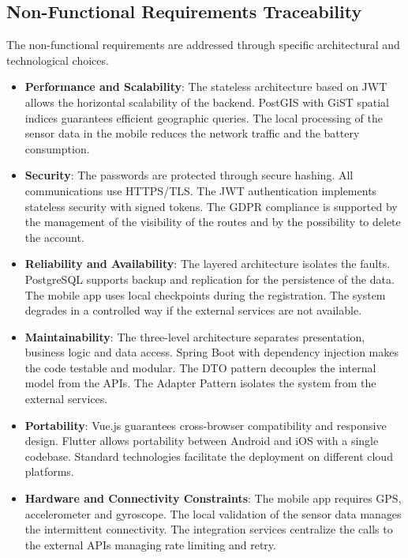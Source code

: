 \subsection{Non-Functional Requirements Traceability}
The non-functional requirements are addressed through specific architectural and technological choices.
\begin{itemize}
    \item \textbf{Performance and Scalability}: The stateless architecture based on JWT allows the horizontal scalability of the backend. PostGIS with GiST spatial indices guarantees efficient geographic queries. The local processing of the sensor data in the mobile reduces the network traffic and the battery consumption.
    \item \textbf{Security}: The passwords are protected through secure hashing. All communications use HTTPS/TLS. The JWT authentication implements stateless security with signed tokens. The GDPR compliance is supported by the management of the visibility of the routes and by the possibility to delete the account.
    \item \textbf{Reliability and Availability}: The layered architecture isolates the faults. PostgreSQL supports backup and replication for the persistence of the data. The mobile app uses local checkpoints during the registration. The system degrades in a controlled way if the external services are not available.
    \item \textbf{Maintainability}: The three-level architecture separates presentation, business logic and data access. Spring Boot with dependency injection makes the code testable and modular. The DTO pattern decouples the internal model from the APIs. The Adapter Pattern isolates the system from the external services.
    \item \textbf{Portability}: Vue.js guarantees cross-browser compatibility and responsive design. Flutter allows portability between Android and iOS with a single codebase. Standard technologies facilitate the deployment on different cloud platforms.
    \item \textbf{Hardware and Connectivity Constraints}: The mobile app requires GPS, accelerometer and gyroscope. The local validation of the sensor data manages the intermittent connectivity. The integration services centralize the calls to the external APIs managing rate limiting and retry.
\end{itemize}